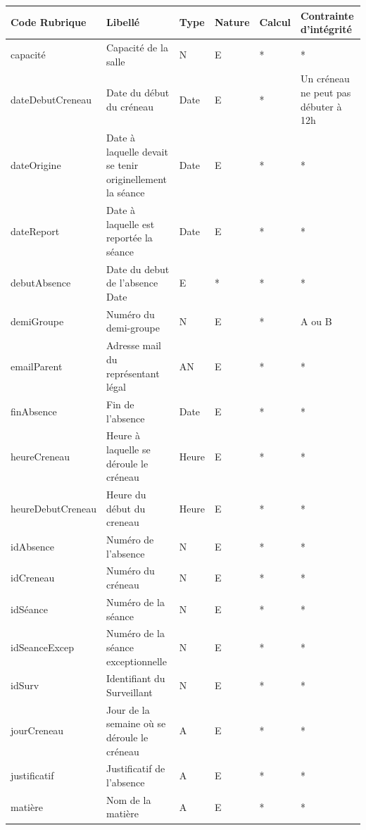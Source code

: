 \documentclass[12pt,french,titlepage]{article}
\begin{document}
	  \begin{tabular}{|p{4cm}|p{3cm}|p{1cm}|p{1cm}|p{1cm}|p{2cm}|}
	  \hline
	      Code Rubrique & Libellé & Type &Nature & Calcul & Contrainte d'intégrité \\ \hline
	      \hline
	       capacité	& Capacité de la salle &	N &	E	& * & *	\\ \hline 
dateDebutCreneau &	Date du début du créneau &	Date &	E & * &		Un créneau ne peut pas débuter à 12h\\ \hline
dateOrigine &	Date à laquelle devait se tenir originellement la séance &	Date &	E & * & *\\ \hline	
dateReport &	Date à laquelle est reportée la séance &	Date &	E & * &*		\\ \hline
debutAbsence &	Date du debut de l'absence	Date &	E &	* & * &*	\\ \hline
demiGroupe	& Numéro du demi-groupe &	N &	E & * & A ou B		\\ \hline
emailParent &	Adresse mail du représentant légal & AN &	E & * & *	\\ \hline	
finAbsence &	Fin de l'absence &	Date &	E & * & * 	\\ \hline
heureCreneau &	Heure à laquelle se déroule le créneau &	Heure &	E & * & *	\\ \hline	
heureDebutCreneau &	Heure du début du creneau &	Heure &	E & * & *	\\ \hline	
idAbsence &	Numéro de l'absence &	N &	E & * & *		\\ \hline
idCreneau &	Numéro du créneau &	N &	E & * & *		\\ \hline
idSéance &	Numéro de la séance	& N &	E & * & *		\\ \hline
idSeanceExcep	& Numéro de la séance exceptionnelle &	N &	E & * & *	\\ \hline	
idSurv	& Identifiant du Surveillant &	N &	E & * & *	\\ \hline	
jourCreneau	& Jour de la semaine où se déroule le créneau &	A &	E & * & *	\\ \hline	
justificatif	& Justificatif de l'absence	& A &	E & * & *	\\ \hline
matière	& Nom de la matière	& A &	E & * & * 	\\ \hline

	  \end{tabular}
	  
\end{document}

